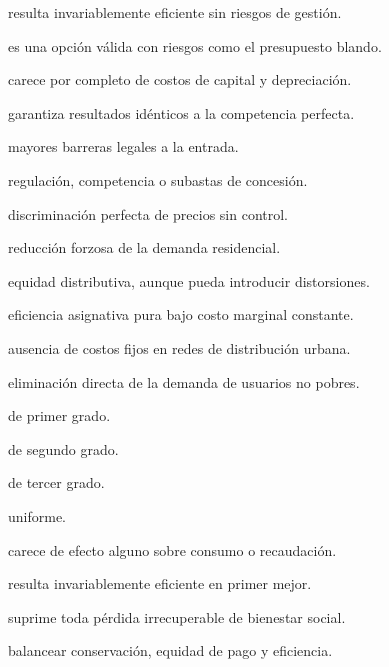 \begin{opts}
    \item resulta invariablemente eficiente sin riesgos de gestión.
    \item es una opción válida con riesgos como el presupuesto blando.
    \item carece por completo de costos de capital y depreciación.
    \item garantiza resultados idénticos a la competencia perfecta.
\end{opts}

\begin{opts}
    \item mayores barreras legales a la entrada.
    \item regulación, competencia o subastas de concesión.
    \item discriminación perfecta de precios sin control.
    \item reducción forzosa de la demanda residencial.
\end{opts}

\begin{opts}
    \item equidad distributiva, aunque pueda introducir distorsiones.
    \item eficiencia asignativa pura bajo costo marginal constante.
    \item ausencia de costos fijos en redes de distribución urbana.
    \item eliminación directa de la demanda de usuarios no pobres.
\end{opts}

\begin{opts}
    \item de primer grado.
    \item de segundo grado.
    \item de tercer grado.
    \item uniforme.
\end{opts}

\begin{opts}
    \item carece de efecto alguno sobre consumo o recaudación.
    \item resulta invariablemente eficiente en primer mejor.
    \item suprime toda pérdida irrecuperable de bienestar social.
    \item balancear conservación, equidad de pago y eficiencia.
\end{opts}

